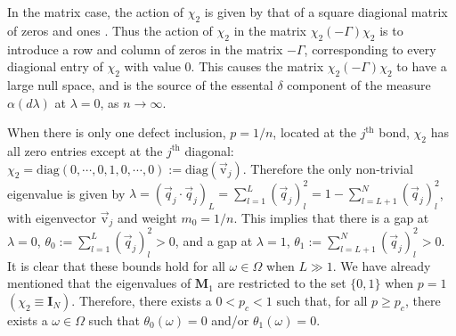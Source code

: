 \documentclass[english,12pt,jmp,graphicx]{revtex4-1}
\begin{document}
In the matrix case, the action of $\chi_2$ is given by that of a square
diagional matrix of zeros and ones \cite{Golden:JoB:337}. Thus
the action of $\chi_2$ in the matrix $\chi_2(-\Gamma)\chi_2$ is to introduce a row
and column of zeros in the matrix $-\Gamma$, corresponding to every
diagional entry of $\chi_2$ with value 0. This causes the matrix
$\chi_2(-\Gamma)\chi_2$ to have a large null space, and is the source of the
essental $\delta$ component of the measure $\alpha(d\lambda)$ at $\lambda=0$, as
$n\to\infty$.

When there is only one defect inclusion, $p=1/n$, located at
the $j^{\text{th}}$ bond, $\chi_2$ has all zero entries except at the $j^{\text{th}}$
diagonal:
$\chi_2=\text{diag}(0,\cdots,0,1,0,\cdots,0):=\text{diag}(\vec{\text{v}}_j)$. Therefore
the only non-trivial eigenvalue is given by 
$\lambda=(\vec{q}_j\cdot\vec{q}_j)_L=\sum_{l=1}^L(\vec{q}_j)_l^2=1-\sum_{l=L+1}^N(\vec{q}_j)_l^2$, 
with eigenvector $\vec{\text{v}}_j$ and weight $m_0=1/n$. This  
implies that there is a gap at $\lambda=0$, $\theta_0:=\sum_{l=1}^L(\vec{q}_j)_l^2>0$,
and a gap at $\lambda=1$, $\theta_1:=\sum_{l=L+1}^N(\vec{q}_j)_l^2>0$. It is clear
that these bounds hold for all $\omega\in\Omega$ when $L\gg1$. We have
already mentioned that the eigenvalues of $\mathbf{M}_1$ are
restricted to the set $\{0,1\}$ when $p=1$
$(\chi_2\equiv\mathbf{I}_N)$. Therefore, there exists a $0<p_c<1$ such that,
for all $p\geq p_c$, there exists a $\omega\in\Omega$ such that $\theta_0(\omega)=0$ and/or
$\theta_1(\omega)=0$.

%
\end{document}
